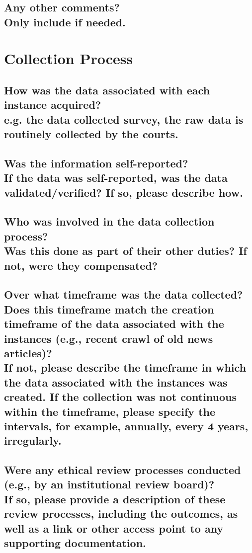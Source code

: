 \documentclass[letterpaper, 10 pt, conference]{ieeeconf}  %
\newcommand{\subtitle}[1]{{\\ \small \normalfont \color{purple} #1}}
\begin{document}
\subsection{Any other comments?
\subtitle{Only include if needed.}}


\section{Collection Process}

\subsection{How was the data associated with each instance acquired? \subtitle {e.g. the data collected survey, the raw data is routinely collected by the courts.}}

\subsection{Was the information self-reported? \subtitle{If the data was self-reported, was the data validated/verified? If so, please describe how.}}


\subsection{Who was involved in the data collection process? \subtitle{Was this done as part of their other duties? If not, were they compensated?}}
 

\subsection{Over what timeframe was the data collected? Does this timeframe match the creation timeframe of the data associated with the instances (e.g., recent crawl of old news articles)? \subtitle{If not, please describe the timeframe in which the data associated with the instances was created. If the collection was not continuous within the timeframe, please specify the intervals, for example, annually, every 4 years, irregularly.}}


\subsection{Were any ethical review processes conducted (e.g., by an institutional review board)? \subtitle{If so, please provide a description of these review processes, including the outcomes, as well as a link or other access point to any supporting documentation.}}
\end{document}
